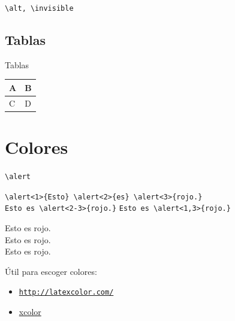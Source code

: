 \documentclass[dvipsnames,xcolor=x11names]{beamer}
\theoremstyle{plain}
\theoremstyle{definition}
\begin{document}
\begin{frame}{\texttt{\textbackslash alt, \textbackslash invisible}}


   \smallskip


\end{frame}

\subsection{Tablas}
\begin{frame}{Tablas}
   \begin{tabular}{l|l}
      A & B\\\hline
      C& D\\
   \end{tabular}

\end{frame}

\section{Colores}
\begin{frame}[fragile]{\texttt{\textbackslash alert}}

   \verb+\alert<1>{Esto} \alert<2>{es} \alert<3>{rojo.}+\\
   \verb+Esto es \alert<2-3>{rojo.}+
   \verb+Esto es \alert<1,3>{rojo.}+
   \bigskip

   \alert<1>{Esto} \alert<2>{es} \alert<3>{rojo.}\\
   Esto es \alert<2-3>{rojo.}\\
   Esto es \alert<1,3>{rojo.}
   \bigskip
   \pause

   \'Util para escoger colores:
   \begin{itemize}
      \item
      \href{http://latexcolor.com/}{\texttt{http://latexcolor.com/}}

      \item \href{http://mirrors.ucr.ac.cr/CTAN/macros/latex/contrib/xcolor/xcolor.pdf}{xcolor}

   \end{itemize}

\end{frame}
\end{document}
